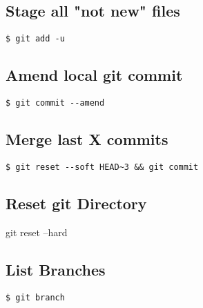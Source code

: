 \documentclass{article}
\begin{document}
\begin{multicols}{3}
\subsection{Stage all "not new" files}
\lstinline|$ git add -u|

\subsection{Amend local git commit}
\lstinline|$ git commit --amend|

\subsection{Merge last X commits}
\lstinline|$ git reset --soft HEAD~3 && git commit|

\subsection{Reset git Directory}
git reset --hard

\subsection{List Branches}
\lstinline|$ git branch|

\end{multicols}
\end{document}
